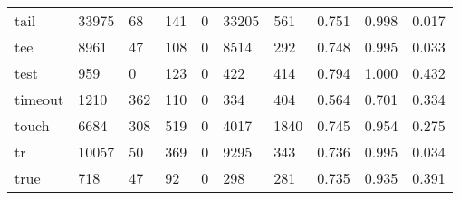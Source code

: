 \begin{longtable}{lp{2.0cm}p{2.0cm}p{2.0cm}p{2.0cm}p{2.0cm}p{2.0cm}p{2.0cm}p{2.0cm}p{2.0cm}}
tail      &                  33975 &                                 68 &                               141 &                                0 &                             33205 &                             561 &                                0.751 &                                  0.998 &                                0.017 \\
tee       &                   8961 &                                 47 &                               108 &                                0 &                              8514 &                             292 &                                0.748 &                                  0.995 &                                0.033 \\
test      &                    959 &                                  0 &                               123 &                                0 &                               422 &                             414 &                                0.794 &                                  1.000 &                                0.432 \\
timeout   &                   1210 &                                362 &                               110 &                                0 &                               334 &                             404 &                                0.564 &                                  0.701 &                                0.334 \\
touch     &                   6684 &                                308 &                               519 &                                0 &                              4017 &                            1840 &                                0.745 &                                  0.954 &                                0.275 \\
tr        &                  10057 &                                 50 &                               369 &                                0 &                              9295 &                             343 &                                0.736 &                                  0.995 &                                0.034 \\
true      &                    718 &                                 47 &                                92 &                                0 &                               298 &                             281 &                                0.735 &                                  0.935 &                                0.391 \\

\end{longtable}

